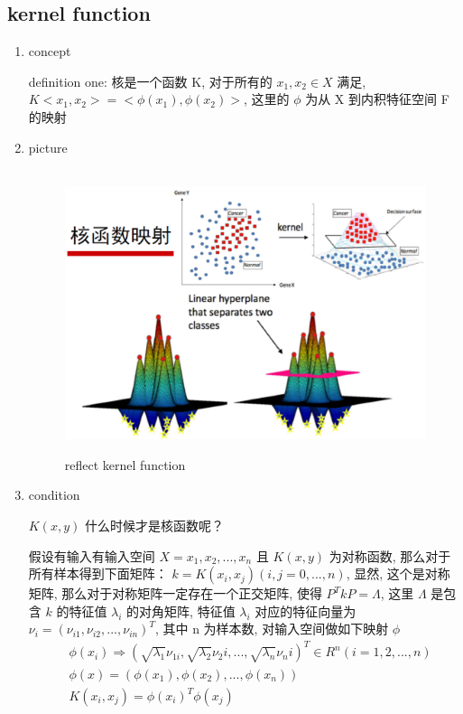 \documentclass[oneside, 12pt]{ctexbook}
\begin{document}
			\subsection{\quad kernel function}
				\begin{enumerate}
					\item concept
						
						definition one: 核是一个函数 K, 对于所有的 $x_1, x_2 \in X$ 满足, $K<x_1, x_2> = <\phi(x_1), \phi(x_2)>$, 这里的 $\phi$ 为从 X 到内积特征空间 F 的映射
					
					\item picture
						\begin{figure}[H]	
							\vspace{-0.2cm}  %
							\setlength{\abovecaptionskip}{-0.2cm}   %
							\centering
							\includegraphics[scale=0.6]{reflect_kernel_function.png}
							\renewcommand{\figurename}{Fig} %
							\caption{reflect kernel function}
							\label{Fig:reflect_kernel_function}
						\end{figure}
					
					\item condition
					
						$K(x, y)$ 什么时候才是核函数呢？
						
						假设有输入有输入空间 $X = x_1, x_2, ..., x_n$ 且 $K(x, y)$ 为对称函数, 那么对于所有样本得到下面矩阵： $k = K(x_i, x_j) (i,j = 0,...,n)$, 显然, 这个是对称矩阵, 那么对于对称矩阵一定存在一个正交矩阵, 使得 $P^T k P = \Lambda$, 这里 $\Lambda$ 是包含 $k$ 的特征值 $\lambda_i$ 的对角矩阵, 特征值 $\lambda_i$ 对应的特征向量为 $\nu_{i} = (\nu_{i1}, \nu_{i2}, ..., \nu_{in})^T$, 其中 n 为样本数, 对输入空间做如下映射 $\phi$
							\begin{align}
								&\phi (x_i) \Rightarrow (\sqrt{\lambda_1} \nu_{1i}, \sqrt{\lambda_2} \nu_2i, ..., \sqrt{\lambda_n} \nu_ni)^T \in R^n (i=1,2,...,n)\\
								&\phi(x) = \left(\phi(x_1), \phi(x_2), ..., \phi(x_n)\right)\\
								&K(x_i,x_j) = \phi(x_i)^T \phi(x_j)
							\end{align}
							

\end{enumerate}
\end{document}
